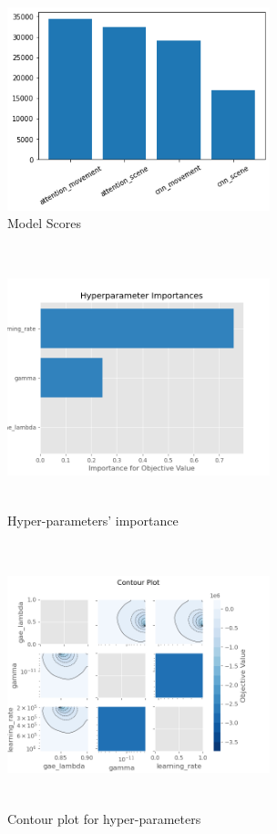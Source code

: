 \documentclass[english]{sobraep}
\begin{document}
\begin{figure}
	\includegraphics[width=3in]{scores.png}
	\centering
	\caption{Model Scores}
	\label{fig:fig5}
\end{figure}
\begin{figure}
	\includegraphics[width=3in, height=3in]{plot_param_importances.png}
	\centering
	\caption{Hyper-parameters' importance}
	\label{fig:fig6}
\end{figure}
\begin{figure}
	\includegraphics[width=3in, height=3in]{biased_movement_contour.png}
	\centering
	\caption{Contour plot for hyper-parameters}
	\label{fig:fig7}
\end{figure}
\end{document}
